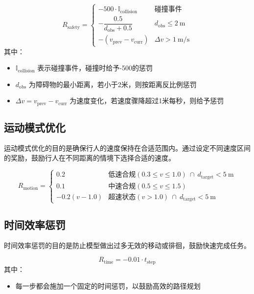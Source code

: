 \begin{equation}
R_{\text{safety}} =
\begin{cases}
-500 \cdot \mathbb{I}_{\text{collision}} & \text{碰撞事件} \\
-\dfrac{0.5}{d_{\text{obs}} + 0.5} & d_{\text{obs}} \leq 2\ \text{m} \\
-(v_{\text{prev}} - v_{\text{curr}}) & \Delta v > 1\ \text{m/s}
\end{cases}
\end{equation}
其中：
\begin{itemize}
    \item \( \mathbb{I}_{\text{collision}} \) 表示碰撞事件，碰撞时给予-500的惩罚
    \item \( d_{\text{obs}} \) 为障碍物的最小距离，若小于2米，则按距离反比例惩罚
    \item \( \Delta v = v_{\text{prev}} - v_{\text{curr}} \) 为速度变化，若速度骤降超过1米每秒，则给予惩罚
\end{itemize}

\subsection{运动模式优化}
运动模式优化的目的是确保行人的速度保持在合适范围内。通过设定不同速度区间的奖励，鼓励行人在不同距离的情境下选择合适的速度。

\begin{equation}
R_{\text{motion}} =
\begin{cases}
0.2 & \text{低速合规}(0.3 \leq v \leq 1.0)\ \cap\ d_{\text{target}} < 5\ \text{m} \\
0.1 & \text{中速合规}(0.5 \leq v \leq 1.5) \\
-0.2(v-1.0) & \text{超速状态}(v > 1.0)\ \cap\ d_{\text{target}} < 5\ \text{m}
\end{cases}
\end{equation}

\subsection{时间效率惩罚}
时间效率惩罚的目的是防止模型做出过多无效的移动或徘徊，鼓励快速完成任务。

\begin{equation}
R_{\text{time}} = -0.01 \cdot t_{\text{step}}
\end{equation}
其中：
\begin{itemize}
    \item 每一步都会施加一个固定的时间惩罚，以鼓励高效的路径规划
\end{itemize}

